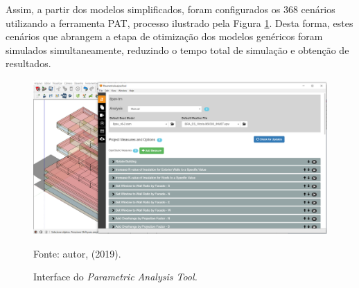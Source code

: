 \noindent Assim, a partir dos modelos simplificados, foram configurados os 368 cenários utilizando a ferramenta PAT, processo ilustrado pela Figura \ref{fig:figure21}. Desta forma, estes cenários que abrangem a etapa de otimização dos modelos genéricos foram simulados simultaneamente, reduzindo o tempo total de simulação e obtenção de resultados.\newline
\begin{figure}[H]
    \caption{Interface do \textit{Parametric Analysis Tool.}}
    \includegraphics[width=1.0\textwidth]{figures/fig21-modelos.png}
    \begin{flushleft}
        \par \small Fonte: autor, (2019).
    \end{flushleft}
    \label{fig:figure21}
\end{figure}

